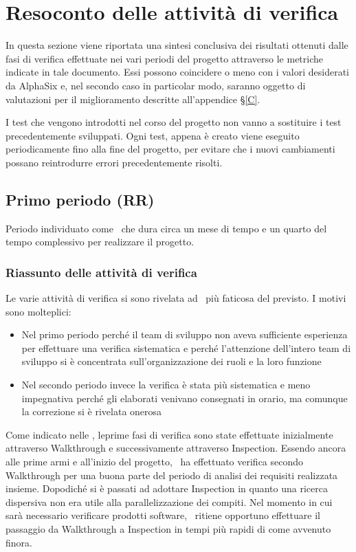 \newpage
\section{Resoconto delle attività di verifica} \label{B}
In questa sezione viene riportata una sintesi conclusiva dei risultati ottenuti dalle fasi di verifica effettuate nei vari periodi del progetto attraverso le metriche indicate in tale documento. Essi possono coincidere o meno con i valori desiderati da AlphaSix e, nel secondo caso in particolar modo, saranno oggetto di valutazioni per il miglioramento descritte all'appendice \S\ref{C}.

I test che vengono introdotti nel corso del progetto non vanno a sostituire i test precedentemente sviluppati. Ogni test, appena è creato viene eseguito periodicamente fino alla fine del progetto, per evitare che i nuovi cambiamenti possano reintrodurre errori precedentemente risolti.

	\subsection{Primo periodo (RR)}
	Periodo individuato come \AdR\ che dura circa un mese di tempo e un quarto del tempo complessivo per realizzare il progetto.
	
	    \subsubsection{Riassunto delle attività di verifica}
	    Le varie attività di verifica si sono rivelata ad \gruppo\ più faticosa del previsto. I motivi sono molteplici:
	    	\begin{itemize}
	    		\item Nel primo periodo perché il team di sviluppo non aveva sufficiente esperienza per effettuare una verifica sistematica e perché l'attenzione dell'intero team di sviluppo si è concentrata sull'organizzazione dei ruoli e la loro funzione
	    		\item Nel secondo periodo invece la verifica è stata più sistematica e meno impegnativa perché gli elaborati venivano consegnati in orario, ma comunque la correzione si è rivelata onerosa
	    	\end{itemize}
	    
	
	    Come indicato nelle \NdPd, leprime fasi di verifica sono state effettuate inizialmente attraverso Walkthrough e successivamente attraverso Inspection. Essendo ancora alle prime armi e all'inizio del progetto, \gruppo\ ha effettuato verifica secondo Walkthrough per una buona parte del periodo di analisi dei requisiti realizzata insieme. Dopodiché si è passati ad adottare Inspection in quanto una ricerca dispersiva non era utile alla parallelizzazione dei compiti. 
	    Nel momento in cui sarà necessario verificare prodotti software, \gruppo\ ritiene opportuno effettuare il passaggio da Walkthrough a Inspection in tempi più rapidi di come avvenuto finora.
	    
